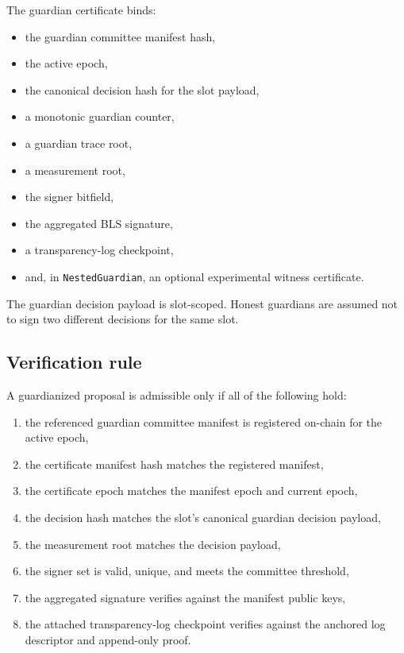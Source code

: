 \documentclass[11pt]{article}
\newcommand{\code}[1]{\texttt{#1}}
\begin{document}
The guardian certificate binds:

\begin{itemize}[leftmargin=1.5em]
\item the guardian committee manifest hash,
\item the active epoch,
\item the canonical decision hash for the slot payload,
\item a monotonic guardian counter,
\item a guardian trace root,
\item a measurement root,
\item the signer bitfield,
\item the aggregated BLS signature,
\item a transparency-log checkpoint,
\item and, in \code{NestedGuardian}, an optional experimental witness
certificate.
\end{itemize}

The guardian decision payload is slot-scoped. Honest guardians are assumed not
to sign two different decisions for the same slot.

\subsection{Verification rule}

A guardianized proposal is admissible only if all of the following hold:

\begin{enumerate}[leftmargin=1.5em]
\item the referenced guardian committee manifest is registered on-chain for the
active epoch,
\item the certificate manifest hash matches the registered manifest,
\item the certificate epoch matches the manifest epoch and current epoch,
\item the decision hash matches the slot's canonical guardian decision payload,
\item the measurement root matches the decision payload,
\item the signer set is valid, unique, and meets the committee threshold,
\item the aggregated signature verifies against the manifest public keys,
\item the attached transparency-log checkpoint verifies against the anchored
log descriptor and append-only proof.
\end{enumerate}
\end{document}
